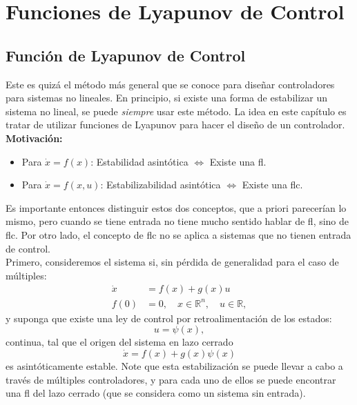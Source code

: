 \chapter{Funciones de Lyapunov de Control}
\section{Función de Lyapunov de Control}

Este es quizá el método más general que se conoce para diseñar controladores para sistemas no lineales. En principio, si existe una forma de estabilizar un sistema no lineal, se puede \textit{siempre} usar este método. La idea en este capítulo es tratar de utilizar funciones de Lyapunov para hacer el diseño de un controlador.\\

\textbf{Motivación:}
\begin{itemize}
	\item Para $\dot{x} = f(x)$: Estabilidad asintótica $\Leftrightarrow$ Existe una \gls{fl}.
	\item Para $\dot{x} = f(x,u)$: Estabilizabilidad asintótica $\Leftrightarrow$ Existe una \gls{flc}.
\end{itemize}

Es importante entonces distinguir estos dos conceptos, que a priori parecerían lo mismo, pero cuando se tiene entrada no tiene mucho sentido hablar de \gls{fl}, sino de \gls{flc}. Por otro lado, el concepto de \gls{flc} no se aplica a sistemas que no tienen entrada de control.\\

Primero, consideremos el sistema \gls{si}, sin pérdida de generalidad para el caso de múltiples:
\begin{equation}
	\begin{aligned}
		\dot{x} & = f(x) + g(x)u                                         \\
		f(0)    & = 0, \quad x \in \mathbb{R}^n, \quad u \in \mathbb{R},
	\end{aligned}
\end{equation}
y suponga que existe una ley de control por retroalimentación de los estados:
\begin{equation*}
	u = \psi(x),
\end{equation*}
continua, tal que el origen del sistema en lazo cerrado
\begin{equation}
	\dot{x} = f(x) + g(x)\psi(x)
\end{equation}
es asintóticamente estable. Note que esta estabilización se puede llevar a cabo a través de múltiples controladores, y para cada uno de ellos se puede encontrar una \gls{fl} del lazo cerrado (que se considera como un sistema sin entrada).\\

